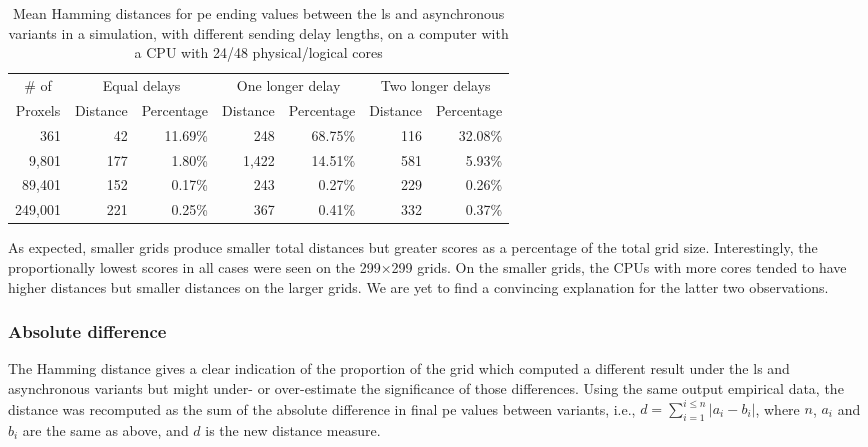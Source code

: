 \begin{table}
\centering
\begin{tabular}{@{}r|rr|rr|rr@{}}
\toprule
\multicolumn{1}{c|}{\# of}   & \multicolumn{2}{c|}{Equal delays} & \multicolumn{2}{c|}{One longer delay} & \multicolumn{2}{c}{Two longer delays} \\ \cmidrule(l){2-7} 
\multicolumn{1}{c|}{Proxels} & Distance     & Percentage     & Distance      & Percentage      & Distance      & Percentage      \\ \midrule
361  & 42  & 11.69\% & 248  & 68.75\% & 116  & 32.08\% \\
9,801  & 177  & 1.80\% & 1,422  & 14.51\% & 581  & 5.93\% \\
89,401  & 152  & 0.17\% & 243  & 0.27\% & 229  & 0.26\% \\
249,001  & 221  & 0.25\% & 367  & 0.41\% & 332  & 0.37\% \\ \bottomrule
\end{tabular}%
\caption[Mean Hamming distances for \acrshort{pe} ending values between the \gls{ls} and asynchronous variants]{Mean Hamming distances for \gls{pe} ending values between the \gls{ls} and asynchronous variants in a simulation, with different sending delay lengths, on a computer with a CPU with 24/48 physical/logical cores}
\label{tab:nmp:hamming48cores}
\end{table}

As expected, smaller grids produce smaller total distances but greater scores as a percentage of the total grid size.  Interestingly, the proportionally lowest scores in all cases were seen on the 299×299 grids.  On the smaller grids, the CPUs with more cores tended to have higher distances but smaller distances on the larger grids.  We are yet to find a convincing explanation for the latter two observations.

\subsubsection{Absolute difference}
The Hamming distance gives a clear indication of the proportion of the grid which computed a different result under the \gls{ls} and asynchronous variants but might under- or over-estimate the significance of those differences.  Using the same output empirical data, the distance was recomputed as the sum of the absolute difference in final \gls{pe} values between variants, i.e., \( d = \sum_{i = 1}^{i \leq n} |a_i - b_i| \), where \(n\), \(a_i\) and \(b_i\) are the same as above, and \(d\) is the new distance measure.

